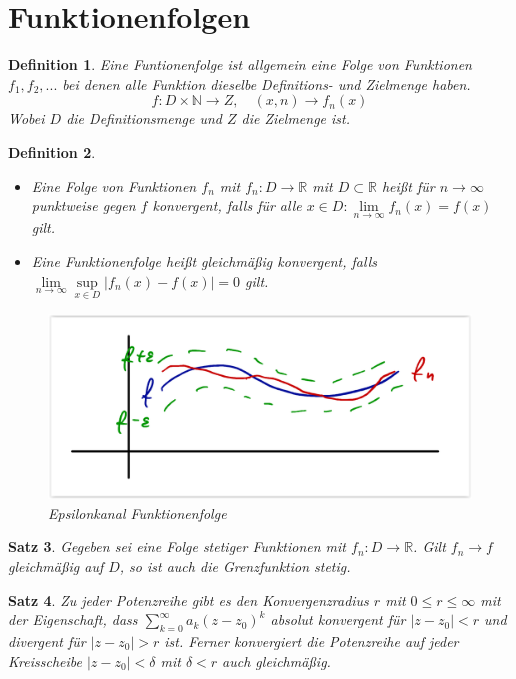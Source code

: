 \documentclass[12pt,a4paper]{article}%
\newtheorem{satz}{Satz}[section]
\newtheorem{definition}[satz]{Definition}
\numberwithin{equation}{section}
\newcommand{\R}{\mathbb{R}} %
\newcommand{\N}{\mathbb{N}}
\numberwithin{equation}{subsection}
\begin{document}
\section{Funktionenfolgen}
\begin{definition}
  Eine Funtionenfolge ist allgemein eine Folge von Funktionen $f_1, f_2, ...$ bei denen alle Funktion dieselbe Definitions- und Zielmenge haben.
  \begin{equation}
  f:D\times \N \rightarrow Z, \quad (x,n) \rightarrow f_n(x)
  \end{equation}
  Wobei $D$ die Definitionsmenge und $Z$ die Zielmenge ist.
\end{definition}
\begin{definition}
  \begin{itemize}
    \item[a )] Eine Folge von Funktionen $f_n$ mit $f_n: D \rightarrow \R$ mit $D \subset \R$ heißt für $n \rightarrow \infty$ punktweise gegen $f$ konvergent, falls für alle $x \in D: \lim\limits_{n \rightarrow \infty} f_n(x) = f(x)$ gilt.
    \item[b )] Eine Funktionenfolge heißt gleichmäßig konvergent, falls \newline $\lim\limits_{n \rightarrow \infty} \sup\limits_{x \in D} |f_n(x) -f(x)| = 0$ gilt.
  \end{itemize}
  \begin{figure}[H] 
		\centering
	  \centering
	  \captionsetup{justification=centering}
	  \includegraphics[width=0.5\linewidth]{funktionenfolgen_konvergenz.png}
	  \caption{Epsilonkanal Funktionenfolge \protect\cite{HM12}}
	  \label{fig:funktionenfolge_konvergenz}
  \end{figure}
\end{definition}
\begin{satz}
  Gegeben sei eine Folge stetiger Funktionen mit $f_n: D\rightarrow \R$. Gilt $f_n \rightarrow f$ gleichmäßig auf $D$, so ist auch die Grenzfunktion stetig.
\end{satz}
\begin{satz}
  Zu jeder Potenzreihe gibt es den Konvergenzradius $r$ mit $0 \leq r \leq \infty$ mit der Eigenschaft, dass $\sum\limits_{k=0}^\infty a_k(z-z_0)^k$ absolut konvergent für $|z-z_0| < r$ und divergent für $|z-z_0|>r$ ist.\newline
  Ferner konvergiert die Potenzreihe auf jeder Kreisscheibe $|z-z_0| < \delta$ mit $\delta < r$ auch gleichmäßig. 
\end{satz}
\end{document}
